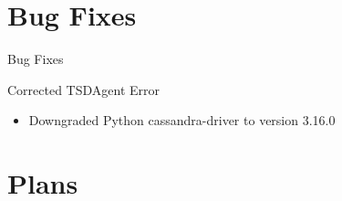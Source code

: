 \documentclass{beamer}
\begin{document}
\section{Bug Fixes}

\begin{frame}{Bug Fixes}
\begin{block}{Corrected TSDAgent Error}
\begin{itemize}
\item Downgraded Python cassandra-driver to version 3.16.0
\end{itemize}
\end{block}
\end{frame}

\section{Plans}
\end{document}
